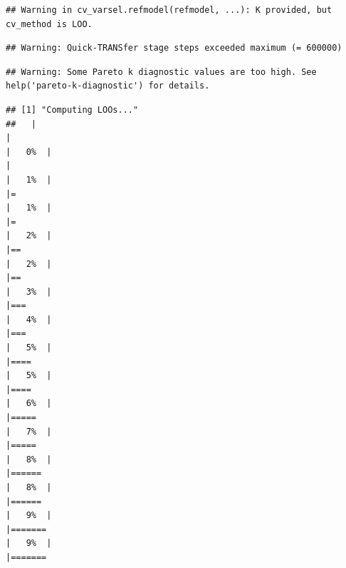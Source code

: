 \documentclass[
]{article}
\begin{document}
\begin{verbatim}
## Warning in cv_varsel.refmodel(refmodel, ...): K provided, but cv_method is LOO.
\end{verbatim}

\begin{verbatim}
## Warning: Quick-TRANSfer stage steps exceeded maximum (= 600000)
\end{verbatim}

\begin{verbatim}
## Warning: Some Pareto k diagnostic values are too high. See help('pareto-k-diagnostic') for details.
\end{verbatim}

\begin{verbatim}
## [1] "Computing LOOs..."
##   |                                                                              |                                                                      |   0%  |                                                                              |                                                                      |   1%  |                                                                              |=                                                                     |   1%  |                                                                              |=                                                                     |   2%  |                                                                              |==                                                                    |   2%  |                                                                              |==                                                                    |   3%  |                                                                              |===                                                                   |   4%  |                                                                              |===                                                                   |   5%  |                                                                              |====                                                                  |   5%  |                                                                              |====                                                                  |   6%  |                                                                              |=====                                                                 |   7%  |                                                                              |=====                                                                 |   8%  |                                                                              |======                                                                |   8%  |                                                                              |======                                                                |   9%  |                                                                              |=======                                                               |   9%  |                                                                              |=======                                                  
\end{verbatim}
\end{document}
